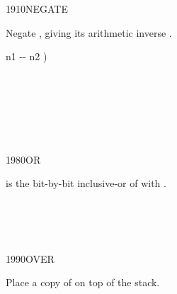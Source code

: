 \begin{worddef}{1910}{NEGATE}
\item {}

	Negate , giving its arithmetic inverse .


	\begin{implement} %
		\word{:}   n1 -{}- n2 ) \\
		\tab {}  \\
		\word{;}
	\end{implement}

	\begin{testing} %
		 \\
		 \\
		 \\
		 \\
	\end{testing}
\end{worddef}


\begin{worddef}{1980}{OR}
\item {}

	 is the bit-by-bit inclusive-or of  with
	.

	\begin{testing} %
		 \\
		 \\
		 \\
	\end{testing}
\end{worddef}


\begin{worddef}{1990}{OVER}
\item {}

	Place a copy of  on top of the stack.

	\begin{testing} %
	\end{testing}
\end{worddef}



